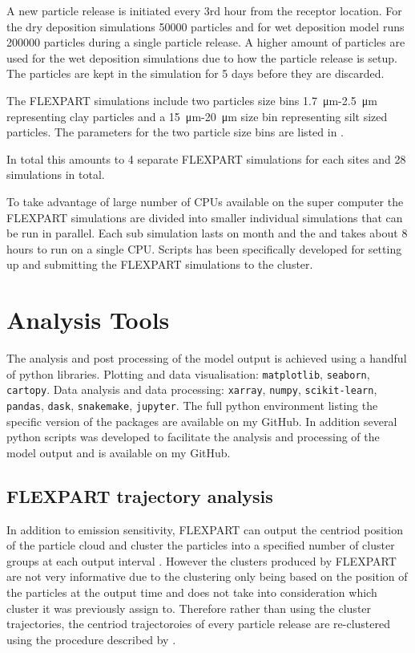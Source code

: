 A new particle release is initiated every 3rd hour from the receptor location. For the dry deposition simulations 50000 particles and for wet deposition model runs 200000 particles during a single particle release. A higher amount of particles are used for the wet deposition simulations due to how the particle release is setup. The particles are kept in the simulation for 5 days before they are discarded. 

The FLEXPART simulations include two particles size bins \SI{1.7}{\micro\metre}-\SI{2.5}{\micro\metre} representing clay particles and a \SI{15}{\micro\metre}-\SI{20}{\micro\metre} size bin representing silt sized particles. The parameters for the two particle size bins are listed in . 

In total this amounts to 4 separate FLEXPART simulations for each sites and 28 simulations in total. 

To take advantage of large number of CPUs available on the super computer the FLEXPART simulations are divided into smaller individual simulations that can be run in parallel. Each sub simulation lasts on month and the and takes about 8 hours to run on a single CPU. Scripts has been specifically developed for setting up and submitting the FLEXPART simulations to the cluster. 

\section{Analysis Tools}
The analysis and post processing of the model output is achieved using a handful of python libraries. Plotting and data visualisation:  \verb|matplotlib|, \verb|seaborn|, \verb|cartopy|. Data analysis and data processing: \verb|xarray|, \verb|numpy|, \verb|scikit-learn|, \verb|pandas|, \verb|dask|, \verb|snakemake|, \verb|jupyter|. The full python environment listing the specific version of the packages are available on my GitHub. In addition several python scripts was developed to facilitate the analysis and processing of the model output and is available on my GitHub.        

\subsection{FLEXPART trajectory analysis}
In addition to emission sensitivity, FLEXPART can output the centriod position of the particle cloud and cluster the particles into a specified number of cluster groups at each output interval \parencite{stohl_replacement_2002}. However the clusters produced by FLEXPART are not very informative due to the clustering only being based on the position of the particles at the output time and does not take into consideration which cluster it was previously assign to. Therefore rather than using the cluster trajectories, the centriod trajectoroies of every particle release are re-clustered using the procedure described by \textcite{dorling1992cluster}. 

